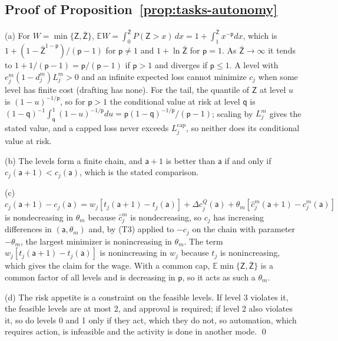 \subsection*{Proof of Proposition~\ref{prop:tasks-autonomy}}

(a) For $W=\min\{\mathsf Z,\bar{\mathsf Z}\}$, $\mathbb EW=\int_0^{\bar{\mathsf Z}}P(\mathsf Z>x)\,dx=1+\int_1^{\bar{\mathsf Z}}x^{-\mathsf p}dx$, which is $1+(1-\bar{\mathsf Z}^{1-\mathsf p})/(\mathsf p-1)$ for $\mathsf p\ne 1$ and $1+\ln\bar{\mathsf Z}$ for $\mathsf p=1$. As $\bar{\mathsf Z}\to\infty$ it tends to $1+1/(\mathsf p-1)=\mathsf p/(\mathsf p-1)$ if $\mathsf p>1$ and diverges if $\mathsf p\le 1$. A level with $e^m_j(1-d^m_j)L^m_j>0$ and an infinite expected loss cannot minimize $c_j$ when some level has finite cost (drafting has none). For the tail, the quantile of $\mathsf Z$ at level $u$ is $(1-u)^{-1/\mathsf p}$, so for $\mathsf p>1$ the conditional value at risk at level $\mathsf q$ is $(1-\mathsf q)^{-1}\int_{\mathsf q}^1(1-u)^{-1/\mathsf p}du=\mathsf p(1-\mathsf q)^{-1/\mathsf p}/(\mathsf p-1)$; scaling by $L^m_j$ gives the stated value, and a capped loss never exceeds $L^{\mathrm{cap}}_j$, so neither does its conditional value at risk.

(b) The levels form a finite chain, and $\mathsf a+1$ is better than $\mathsf a$ if and only if $c_j(\mathsf a+1)<c_j(\mathsf a)$, which is the stated comparison.

(c) $c_j(\mathsf a+1)-c_j(\mathsf a)=w_j[t_j(\mathsf a+1)-t_j(\mathsf a)]+\Delta c^Q_j(\mathsf a)+\theta_m[\hat c^m_j(\mathsf a+1)-\hat c^m_j(\mathsf a)]$ is nondecreasing in $\theta_m$ because $\hat c^m_j$ is nondecreasing, so $c_j$ has increasing differences in $(\mathsf a,\theta_m)$ and, by (T3) applied to $-c_j$ on the chain with parameter $-\theta_m$, the largest minimizer is nonincreasing in $\theta_m$. The term $w_j[t_j(\mathsf a+1)-t_j(\mathsf a)]$ is nonincreasing in $w_j$ because $t_j$ is nonincreasing, which gives the claim for the wage. With a common cap, $\mathbb E\min\{\mathsf Z,\bar{\mathsf Z}\}$ is a common factor of all levels and is decreasing in $\mathsf p$, so it acts as such a $\theta_m$.

(d) The risk appetite is a constraint on the feasible levels. If level 3 violates it, the feasible levels are at most 2, and approval is required; if level 2 also violates it, so do levels 0 and 1 only if they act, which they do not, so automation, which requires action, is infeasible and the activity is done in another mode. \qed

